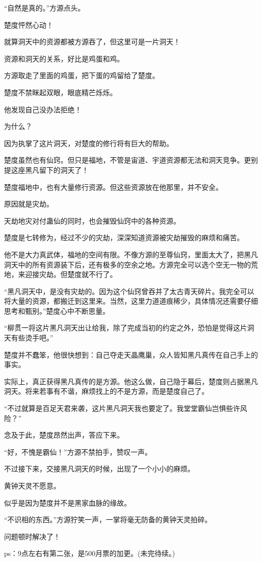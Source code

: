 \begin{this_body}
“自然是真的。”方源点头。

楚度怦然心动！

就算洞天中的资源都被方源吞了，但这里可是一片洞天！

资源和洞天的关系，好比是鸡蛋和鸡。

方源取走了里面的鸡蛋，把下蛋的鸡留给了楚度。

楚度不禁眯起双眼，眼底精芒烁烁。

他发现自己没办法拒绝！

为什么？

因为执掌了这片洞天，对楚度的修行将有巨大的帮助。

楚度虽然也有仙窍。但只是福地，不管是宙道、宇道资源都无法和洞天竞争。更别提这座黑凡留下的洞天了！

楚度福地中，也有大量修行资源。但这些资源放在他那里，并不安全。

原因就是灾劫。

天劫地灾对付蛊仙的同时，也会摧毁仙窍中的各种资源。

楚度是七转修为，经过不少的灾劫，深深知道资源被灾劫摧毁的麻烦和痛苦。

他不是大力真武体，福地的空间有限。不像方源的至尊仙窍，里面太大了，把黑凡洞天中的所有资源装下后，还有极多的空余之地。方源完全可以选个空无一物的荒地，来迎接灾劫。但楚度就不行了。

“黑凡洞天中，是没有灾劫的。因为这个仙窍曾吞并了太古青天碎片。我完全可以将大量的资源，都搬迁到这里来。当然，这里力道道痕稀少，具体情况还需要仔细思考和甄别。”楚度心中不断思量。

“柳贯一将这片黑凡洞天出让给我，除了完成当初的约定之外，恐怕是觉得这片洞天有些烫手吧。”

楚度并不蠢笨，他很快想到：自己夺走天晶鹰巢，众人皆知黑凡真传在自己手上的事实。

实际上，真正获得黑凡真传的是方源。他这么做，自己隐于幕后，楚度则占据黑凡洞天。将来若事有不谐，麻烦找上的不是方源，而是楚度自己了。

“不过就算是百足天君来袭，这片黑凡洞天我也要定了。我堂堂霸仙岂惧些许风险？”

念及于此，楚度昂然出声，答应下来。

“好，不愧是霸仙！”方源不禁拍手，赞叹一声。

不过接下来，交接黑凡洞天的时候，出现了一个小小的麻烦。

黄钟天灵不愿意。

似乎是因为楚度并不是黑家血脉的缘故。

“不识相的东西。”方源狞笑一声，一掌将毫无防备的黄钟天灵拍碎。

问题顿时解决了！

ps：9点左右有第二张，是500月票的加更。(未完待续。)

\end{this_body}

